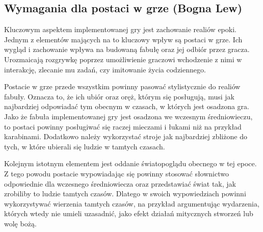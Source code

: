 \subsection{Wymagania dla postaci w grze (Bogna Lew)}
Kluczowym aspektem implementowanej gry jest zachowanie realiów epoki. Jednym z elementów mających na to kluczowy wpływ
są postaci w grze. Ich wygląd i zachowanie wpływa na budowaną fabułę oraz jej odbiór przez gracza. Urozmaicają rozgrywkę
poprzez umożliwienie graczowi wchodzenie z nimi w interakcję, zlecanie mu zadań, czy imitowanie życia codziennego.

Postacie w grze przede wszystkim powinny pasować stylistycznie do realiów fabuły. Oznacza to, że ich ubiór oraz oręż,
którym się posługują, musi jak najbardziej odpowiadać tym obecnym w czasach, w których jest osadzona gra. Jako że
fabuła implementowanej gry jest osadzona we wczesnym średniowieczu, to postaci powinny posługiwać się raczej mieczami i
łukami niż na przykład karabinami. Dodatkowo należy wykorzystać stroje jak najbardziej zbliżone do tych, w które ubierali
się ludzie w tamtych czasach.

Kolejnym istotnym elementem jest oddanie światopoglądu obecnego w tej epoce. Z tego powodu postacie wypowiadając się
powinny stosować słownictwo odpowiednie dla wczesnego średniowiecza oraz przedstawiać świat tak, jak zrobiliby to
ludzie tamtych czasów. Dlatego w swoich wypowiedziach powinni wykorzystywać wierzenia tamtych czasów, na przykład
argumentując wydarzenia, których wtedy nie umieli uzasadnić, jako efekt działań mitycznych stworzeń lub wolę bożą.